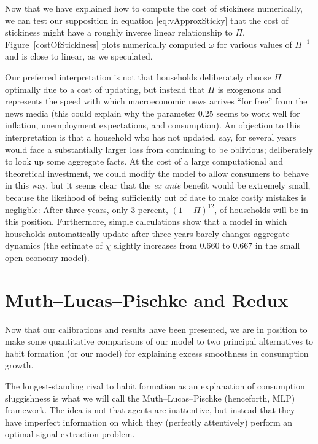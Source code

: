\documentclass[titlepage]{\econtex}\newcommand{\texname}{cAndCwithStickyE}
\begin{document}
Now that we have explained how to compute the cost of stickiness numerically, we can test our supposition in equation \eqref{eq:vApproxSticky} that the cost of stickiness might have a roughly inverse linear relationship to $\Pi$.  Figure~\ref{costOfStickiness} plots numerically computed $\omega$ for various values of $\Pi^{-1}$ and is close to linear, as we speculated.

Our preferred interpretation is not that households deliberately choose $\Pi$ optimally due to a cost of updating, but instead that $\Pi$ is exogenous and represents the speed with which macroeconomic news arrives ``for free'' from the news media (this could explain why the parameter $0.25$ seems to work well for inflation, unemployment expectations, and consumption). An objection to this interpretation is that a household who has not updated, say, for several years would face a substantially larger loss from continuing to be oblivious; deliberately to look up some aggregate facts.  At the cost of a large computational and theoretical investment, we could modify the model to allow consumers to behave in this way, but it seems clear that the {\it ex ante} benefit would be extremely small, because the likeihood of being sufficiently out of date to make costly mistakes is negligble:   After three years, only 3 percent, $(1-\Pi)^{12}$, of households will be in this position.  Furthermore, simple calculations show that a model in which households automatically update after three years barely changes aggregate dynamics (the estimate of $\chi$ slightly increases from 0.660 to 0.667 in the small open economy model).

\section{Muth--Lucas--Pischke and \cite{reis:inattentive} Redux} \label{sec:Comparisons}

Now that our calibrations and results have been presented, we are in position to make some quantitative comparisons of our model to two principal alternatives to habit formation (or our model) for explaining excess smoothness in consumption growth.

The longest-standing rival to habit formation as an explanation of consumption sluggishness is what we will call the Muth--Lucas--Pischke (henceforth, MLP) framework.  The idea is not that agents are inattentive, but instead that they have imperfect information on which they (perfectly attentively) perform an optimal signal extraction problem.
\end{document}
